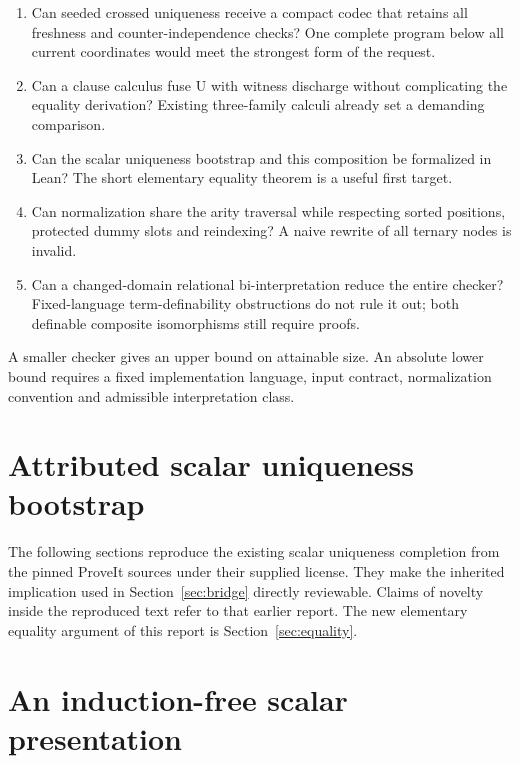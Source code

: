 \documentclass[11pt]{article}
\begin{document}
\begin{enumerate}
\item Can seeded crossed uniqueness receive a compact codec that retains
all freshness and counter-independence checks? One complete program below
all current coordinates would meet the strongest form of the request.
\item Can a clause calculus fuse U with witness discharge without
complicating the equality derivation? Existing three-family calculi
already set a demanding comparison.
\item Can the scalar uniqueness bootstrap and this composition be
formalized in Lean? The short elementary equality theorem is a useful
first target.
\item Can normalization share the arity traversal while respecting
sorted positions, protected dummy slots and reindexing? A naive rewrite
of all ternary nodes is invalid.
\item Can a changed-domain relational bi-interpretation reduce the entire
checker? Fixed-language term-definability obstructions do not rule it out;
both definable composite isomorphisms still require proofs.
\end{enumerate}
A smaller checker gives an upper bound on attainable size. An absolute
lower bound requires a fixed implementation language, input contract,
normalization convention and admissible interpretation class.



\appendix
\clearpage
\section{Attributed scalar uniqueness bootstrap}\label{app:ur}
The following sections reproduce the existing scalar uniqueness completion
from the pinned ProveIt sources under their supplied license. They make
the inherited implication used in Section~\ref{sec:bridge} directly
reviewable. Claims of novelty inside the reproduced text refer to that
earlier report. The new elementary equality argument of this report is
Section~\ref{sec:equality}.
\makeatletter
{}
\makeatother


\section{An induction-free scalar presentation}
\label{sec:ur-main}
\end{document}
